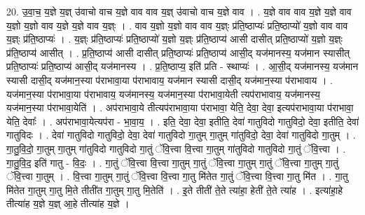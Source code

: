 \documentclass[17pt]{extarticle}
\begin{document}
20. उ॒वा॒च॒ य॒ज्ञे य॒ज्ञ् उ॑वाचो वाच य॒ज्ञे वाव वाव य॒ज्ञ् उ॑वाचो वाच य॒ज्ञे वाव । . य॒ज्ञे वाव वाव य॒ज्ञे य॒ज्ञे वाव य॒ज्ञो य॒ज्ञो वाव य॒ज्ञे य॒ज्ञे वाव य॒ज्ञ्ः । . वाव य॒ज्ञो य॒ज्ञो वाव वाव य॒ज्ञ्ः प्र॑ति॒ष्ठाप्यः॑ प्रति॒ष्ठाप्यो॑ य॒ज्ञो वाव वाव य॒ज्ञ्ः प्र॑ति॒ष्ठाप्यः॑ । . य॒ज्ञ्ः प्र॑ति॒ष्ठाप्यः॑ प्रति॒ष्ठाप्यो॑ य॒ज्ञो य॒ज्ञ्ः प्र॑ति॒ष्ठाप्य॑ आसी दासीत् प्रति॒ष्ठाप्यो॑ य॒ज्ञो य॒ज्ञ्ः प्र॑ति॒ष्ठाप्य॑ आसीत् । . प्र॒ति॒ष्ठाप्य॑ आसी दासीत् प्रति॒ष्ठाप्यः॑ प्रति॒ष्ठाप्य॑ आसी॒द् यज॑मानस्य॒ यज॑मान स्यासीत् प्रति॒ष्ठाप्यः॑ प्रति॒ष्ठाप्य॑ आसी॒द् यज॑मानस्य । . प्र॒ति॒ष्ठाप्य॒ इति॑ प्रति - स्थाप्यः॑ । . आ॒सी॒द् यज॑मानस्य॒ यज॑मान स्यासी दासी॒द् यज॑मान॒स्या प॑राभावा॒या प॑राभावाय॒ यज॑मान स्यासी दासी॒द् यज॑मान॒स्या प॑राभावाय । . यज॑मान॒स्या प॑राभावा॒या प॑राभावाय॒ यज॑मानस्य॒ यज॑मान॒स्या प॑राभावा॒येती त्यप॑राभावाय॒ यज॑मानस्य॒ यज॑मान॒स्या प॑राभावा॒येति॑ । . अप॑राभावा॒ये तीत्यप॑राभावा॒या प॑राभावा॒ येति॒ देवा॒ देवा॒ इत्यप॑राभावा॒या प॑राभावा॒ येति॒ देवाः᳚ । . अप॑राभावा॒येत्यप॑रा - भा॒वा॒य॒ । . इति॒ देवा॒ देवा॒ इतीति॒ देवा॑ गातुविदो गातुविदो॒ देवा॒ इतीति॒ देवा॑ गातुविदः । . देवा॑ गातुविदो गातुविदो॒ देवा॒ देवा॑ गातुविदो गा॒तुम् गा॒तुम् गा॑तुविदो॒ देवा॒ देवा॑ गातुविदो गा॒तुम् । . गा॒तु॒वि॒दो॒ गा॒तुम् गा॒तुम् गा॑तुविदो गातुविदो गा॒तुं ॅवि॒त्त्वा वि॒त्त्वा गा॒तुम् गा॑तुविदो गातुविदो गा॒तुं ॅवि॒त्त्वा । . गा॒तु॒वि॒द॒ इति॑ गातु - वि॒दः॒ । . गा॒तुं ॅवि॒त्त्वा वि॒त्त्वा गा॒तुम् गा॒तुं ॅवि॒त्त्वा गा॒तुम् गा॒तुं ॅवि॒त्त्वा गा॒तुम् गा॒तुं ॅवि॒त्त्वा गा॒तुम् । . वि॒त्त्वा गा॒तुम् गा॒तुं ॅवि॒त्त्वा वि॒त्त्वा गा॒तु मि॑तेत गा॒तुं ॅवि॒त्त्वा वि॒त्त्वा गा॒तु मि॑त । . गा॒तु मि॑तेत गा॒तुम् गा॒तु मि॒ते तीती॑त गा॒तुम् गा॒तु मि॒तेति॑ । . इ॒ते तीती॑ ते॒ते त्या॑हा॒ हेती॑ ते॒ते त्या॑ह । . इत्या॑हा॒हे तीत्या॑ह य॒ज्ञे य॒ज्ञ् आ॒हे तीत्या॑ह य॒ज्ञे । \newline
\end{document}
